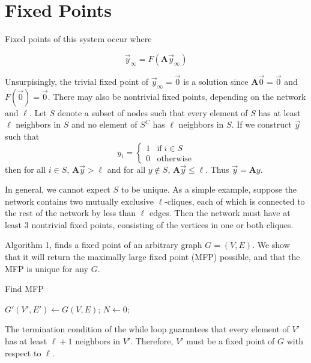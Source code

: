 \documentclass[12pt]{article}
\begin{document}
\section{Fixed Points}

Fixed points of this system occur where

\begin{equation}
  \vec{y}_{\infty} = F(\mathbf{A}\vec{y}_{\infty})
\end{equation}

Unsurpisingly, the trivial fixed point of $\vec{y}_{\infty} = \vec{0}$ is a solution since $\mathbf{A}\vec{0} = \vec{0}$ and $F(\vec{0}) = \vec{0}$.  There may also be nontrivial fixed points, depending on the network and $\ell$.  Let $S$ denote a subset of nodes such that every element of $S$ has at least $\ell$ neighbors in $S$ and no element of $S^C$ has $\ell$ neighbors in $S$.  If we construct $\vec{y}$ such that  
\begin{equation}
  y_i = \begin{cases}
    1 &\text{if} \; i \in S \\
    0 &\text{otherwise}
  \end{cases}
\end{equation}
 then for all $i \in S$, $\mathbf{A}\vec{y} > \ell$ and for all $y \notin S$, $\mathbf{A}\vec{y} \leq \ell$.  Thus $\vec{y} = \mathbf{A}y$. 

In general, we cannot expect $S$ to be unique.  As a simple example, suppose the network contains two mutually exclusive $\ell$-cliques, each of which is connected to the rest of the network by less than $\ell$ edges.  Then the network must have at least 3 nontrivial fixed points, consisting of the vertices in one or both cliques.

Algorithm 1, finds a fixed point of an arbitrary graph $G=(V,E)$.  We show that it will return the maximally large fixed point (MFP) possible, and that the MFP is unique for any $G$.

\begin{algorithm}
  \caption{Find MFP}\label{alg:two}
  $G'(V', E') \gets G(V, E)$;
  $N \gets 0$;
  \end{algorithm}

  The termination condition of the while loop guarantees that every element of $V'$ has at least $\ell + 1$ neighbors in $V'$.  Therefore, $V'$ must be a fixed point of $G$ with respect to $\ell$.  
  
\end{document}
